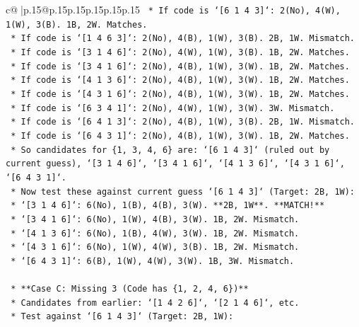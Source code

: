 \documentclass{article}
\begin{document}
{\begin{supertabular}{c@{$\;$}|p{.15\linewidth}@{}p{.15\linewidth}p{.15\linewidth}p{.15\linewidth}p{.15\linewidth}p{.15\linewidth}}
{{{\texttt{                *   If code is `{[}6 1 4 3{]}`: 2(No), 4(W), 1(W), 3(B). 1B, 2W. Matches.} \\
\texttt{                *   If code is `{[}1 4 6 3{]}`: 2(No), 4(B), 1(W), 3(B). 2B, 1W. Mismatch.} \\
\texttt{                *   If code is `{[}3 1 4 6{]}`: 2(No), 4(W), 1(W), 3(B). 1B, 2W. Matches.} \\
\texttt{                *   If code is `{[}3 4 1 6{]}`: 2(No), 4(B), 1(W), 3(W). 1B, 2W. Matches.} \\
\texttt{                *   If code is `{[}4 1 3 6{]}`: 2(No), 4(B), 1(W), 3(W). 1B, 2W. Matches.} \\
\texttt{                *   If code is `{[}4 3 1 6{]}`: 2(No), 4(B), 1(W), 3(W). 1B, 2W. Matches.} \\
\texttt{                *   If code is `{[}6 3 4 1{]}`: 2(No), 4(W), 1(W), 3(W). 3W. Mismatch.} \\
\texttt{                *   If code is `{[}6 4 1 3{]}`: 2(No), 4(B), 1(W), 3(B). 2B, 1W. Mismatch.} \\
\texttt{                *   If code is `{[}6 4 3 1{]}`: 2(No), 4(B), 1(W), 3(W). 1B, 2W. Matches.} \\
\texttt{        *   So candidates for \{1, 3, 4, 6\} are: `{[}6 1 4 3{]}` (ruled out by current guess), `{[}3 1 4 6{]}`, `{[}3 4 1 6{]}`, `{[}4 1 3 6{]}`, `{[}4 3 1 6{]}`, `{[}6 4 3 1{]}`.} \\
\texttt{        *   Now test these against current guess `{[}6 1 4 3{]}` (Target: 2B, 1W):} \\
\texttt{            *   `{[}3 1 4 6{]}`: 6(No), 1(B), 4(B), 3(W). **2B, 1W**. **MATCH!**} \\
\texttt{            *   `{[}3 4 1 6{]}`: 6(No), 1(W), 4(B), 3(W). 1B, 2W. Mismatch.} \\
\texttt{            *   `{[}4 1 3 6{]}`: 6(No), 1(B), 4(W), 3(W). 1B, 2W. Mismatch.} \\
\texttt{            *   `{[}4 3 1 6{]}`: 6(No), 1(W), 4(W), 3(B). 1B, 2W. Mismatch.} \\
\texttt{            *   `{[}6 4 3 1{]}`: 6(B), 1(W), 4(W), 3(W). 1B, 3W. Mismatch.} \\
\\ 
\texttt{    *   **Case C: Missing 3 (Code has \{1, 2, 4, 6\})**} \\
\texttt{        *   Candidates from earlier: `{[}1 4 2 6{]}`, `{[}2 1 4 6{]}`, etc.} \\
\texttt{        *   Test against `{[}6 1 4 3{]}` (Target: 2B, 1W):} \\
}}}
\end{supertabular}}
\end{document}
